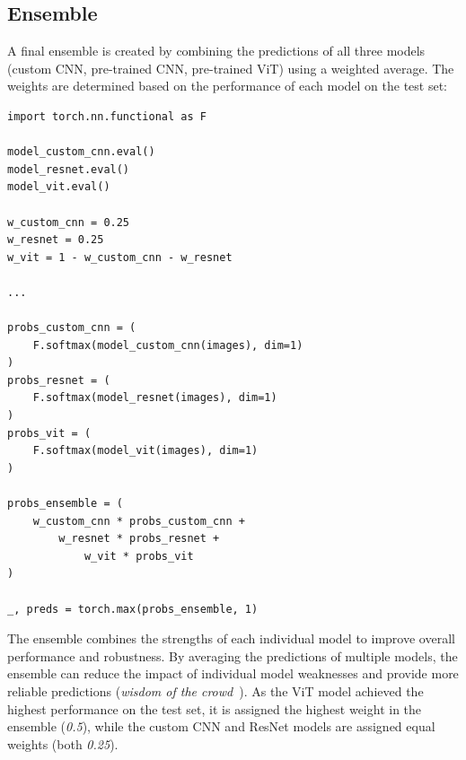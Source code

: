 \subsection{Ensemble}

A final ensemble is created by combining the predictions of all three models (custom CNN, pre-trained CNN, pre-trained ViT) using a weighted average. The weights are determined based on the performance of each model on the test set:

\begin{minipage}{0.9\linewidth}\begin{lstlisting}[caption={Ensemble predictions using a weighted average.},label={lst:ensemble}]
import torch.nn.functional as F

model_custom_cnn.eval()
model_resnet.eval()
model_vit.eval()

w_custom_cnn = 0.25
w_resnet = 0.25
w_vit = 1 - w_custom_cnn - w_resnet

...

probs_custom_cnn = (
    F.softmax(model_custom_cnn(images), dim=1)
)
probs_resnet = (
    F.softmax(model_resnet(images), dim=1)
)
probs_vit = (
    F.softmax(model_vit(images), dim=1)
)

probs_ensemble = (
    w_custom_cnn * probs_custom_cnn +
        w_resnet * probs_resnet +
            w_vit * probs_vit
)

_, preds = torch.max(probs_ensemble, 1)
\end{lstlisting}\end{minipage}

The ensemble combines the strengths of each individual model to improve overall performance and robustness. By averaging the predictions of multiple models, the ensemble can reduce the impact of individual model weaknesses and provide more reliable predictions (\textit{wisdom of the crowd}~\cite[Chapter~7]{geronoctober2022hands}). As the ViT model achieved the highest performance on the test set, it is assigned the highest weight in the ensemble (\textit{0.5}), while the custom CNN and ResNet models are assigned equal weights (both \textit{0.25}).